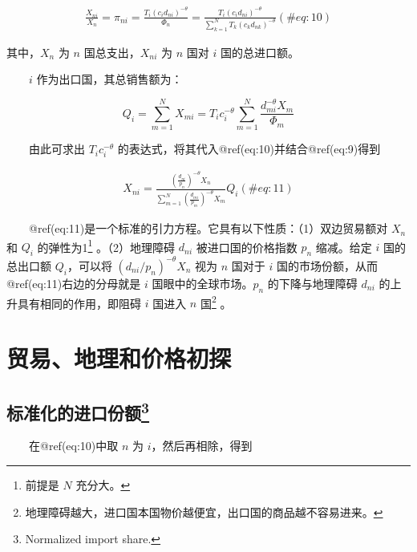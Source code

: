 \documentclass[]{tufte-handout}
\begin{document}
\begin{align}
\frac{X_{n i}}{X_{n}}=\pi_{ni}=\frac{T_{i}\left(c_{i} d_{n i}\right)^{-\theta}}{\Phi_{n}}=\frac{T_{i}\left(c_{i} d_{n i}\right)^{-\theta}}{\sum_{k=1}^{N} T_{k}\left(c_{k} d_{n k}\right)^{-\theta}} (\#eq:10)
\end{align}

其中，\(X_{n}\) 为 \(n\) 国总支出，\(X_{n i}\) 为 \(n\) 国对 \(i\)
国的总进口额。

　　\(i\) 作为出口国，其总销售额为：

\[
Q_{i}=\sum_{m=1}^{N} X_{m i}=T_{i} c_{i}^{-\theta} \sum_{m=1}^{N} \frac{d_{m i}^{-\theta} X_{m}}{\Phi_{m}}
\]

　　由此可求出 \(T_{i} c_{i}^{-\theta}\)
的表达式，将其代入@ref(eq:10)并结合@ref(eq:9)得到

\begin{align}
X_{n i}=\frac{\left(\frac{d_{n i}}{p_{n}}\right)^{-\theta} X_{n}}{\sum_{m=1}^{N}\left(\frac{d_{m i}}{p_{m}}\right)^{-\theta} X_{m}} Q_{i} (\#eq:11)
\end{align}

　　@ref(eq:11)是一个标准的{引力方程}。它具有以下性质：（1）双边贸易额对
\(X_n\) 和 \(Q_i\) 的弹性为1\footnote{前提是 \(N\) 充分大。}
。（2）地理障碍 \(d_{ni}\) 被进口国的价格指数 \(p_n\) 缩减。给定 \(i\)
国的总出口额 \(Q_i\)，可以将
\({\left({d_{n i}}/{p_{n}}\right)^{-\theta} X_{n}}\) 视为 \(n\) 国对于
\(i\) 国的市场份额，从而@ref(eq:11)右边的分母就是 \(i\)
国眼中的全球市场。\(p_n\) 的下降与地理障碍 \(d_{ni}\)
的上升具有相同的作用，即阻碍 \(i\) 国进入 \(n\) 国\footnote{地理障碍越大，进口国本国物价越便宜，出口国的商品越不容易进来。}
。

\hypertarget{ux8d38ux6613ux5730ux7406ux548cux4ef7ux683cux521dux63a2}{%
\section{贸易、地理和价格初探}\label{ux8d38ux6613ux5730ux7406ux548cux4ef7ux683cux521dux63a2}}

\hypertarget{ux6807ux51c6ux5316ux7684ux8fdbux53e3ux4efdux989d}{%
\subsection[标准化的进口份额]{\texorpdfstring{标准化的进口份额\footnote{Normalized
  import share.}}{标准化的进口份额}}\label{ux6807ux51c6ux5316ux7684ux8fdbux53e3ux4efdux989d}}

　　在@ref(eq:10)中取 \(n\) 为 \(i\)，然后再相除，得到
\end{document}
